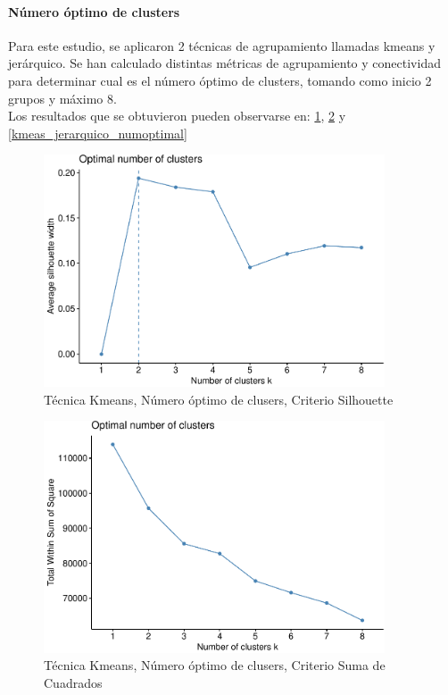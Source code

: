 \paragraph{\textbf{Número óptimo de clusters}} \label{estudio-del-numero-optimo-de-clusters}
Para este estudio, se aplicaron 2 técnicas de agrupamiento llamadas kmeans y jerárquico. Se han calculado distintas métricas de agrupamiento y conectividad para determinar cual es el número óptimo de clusters, tomando como inicio 2 grupos y máximo 8.\\

Los resultados que se obtuvieron pueden observarse en: \ref{fig:kmeans_numoptimal_silhouette},  \ref{fig:kmeans_numoptimal_sumsquare} y \ref{kmeas_jerarquico_numoptimal}

\begin{figure}[!htb]
	\centering
	\includegraphics[width=0.9\textwidth]{imagenes/modelo_clusters/unnamed-chunk-15-1.pdf}
	\caption{Técnica Kmeans, Número óptimo de clusers, Criterio Silhouette}
	\label{fig:kmeans_numoptimal_silhouette}
\end{figure}

\begin{figure}[!htb]
	\centering
	\includegraphics[width=0.9\textwidth]{imagenes/modelo_clusters/unnamed-chunk-15-2.pdf}
	\caption{Técnica Kmeans, Número óptimo de clusers, Criterio Suma de Cuadrados}
	\label{fig:kmeans_numoptimal_sumsquare}
\end{figure}

